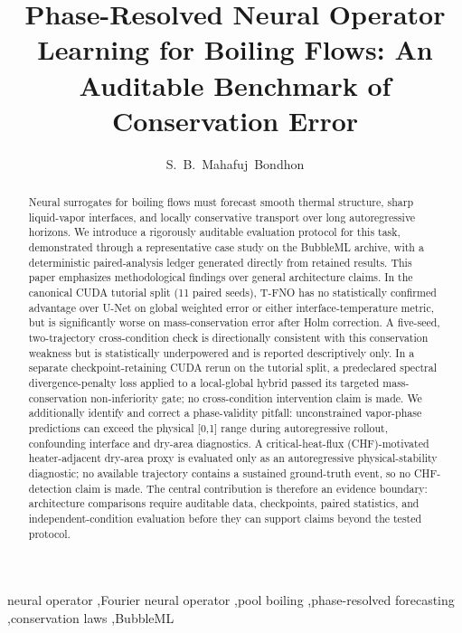 \documentclass[preprint,12pt]{elsarticle}
\begin{document}
\sloppy
\begin{frontmatter}

\title{Phase-Resolved Neural Operator Learning for Boiling Flows: An
Auditable Benchmark of Conservation Error}
\author[buet]{S.~B.~Mahafuj~Bondhon}


\begin{abstract}
Neural surrogates for boiling flows must forecast smooth thermal
structure, sharp liquid-vapor interfaces, and locally conservative
transport over long autoregressive horizons. We introduce a rigorously
auditable evaluation protocol for this task, demonstrated through a
representative case study on the BubbleML archive, with a deterministic
paired-analysis ledger generated directly from retained results. This
paper emphasizes methodological findings over general architecture
claims. In the canonical CUDA tutorial split (11 paired seeds), T-FNO
has no statistically confirmed advantage over U-Net on global weighted
error or either interface-temperature metric, but is significantly worse
on mass-conservation error after Holm correction. A five-seed,
two-trajectory cross-condition check is directionally consistent with
this conservation weakness but is statistically underpowered and is
reported descriptively only. In a separate checkpoint-retaining CUDA
rerun on the tutorial split, a predeclared spectral divergence-penalty
loss applied to a local-global hybrid passed its targeted
mass-conservation non-inferiority gate; no cross-condition intervention
claim is made. We additionally identify and correct a phase-validity
pitfall: unconstrained vapor-phase predictions can exceed the physical
{[}0,1{]} range during autoregressive rollout, confounding interface and
dry-area diagnostics. A critical-heat-flux (CHF)-motivated
heater-adjacent dry-area proxy is evaluated only as an autoregressive
physical-stability diagnostic; no available trajectory contains a
sustained ground-truth event, so no CHF-detection claim is made. The
central contribution is therefore an evidence boundary: architecture
comparisons require auditable data, checkpoints, paired statistics, and
independent-condition evaluation before they can support claims beyond
the tested protocol.
\end{abstract}

\begin{keyword}
neural operator \sep Fourier neural operator \sep pool boiling \sep phase-resolved forecasting \sep conservation laws \sep BubbleML
\end{keyword}

\end{frontmatter}
\end{document}
